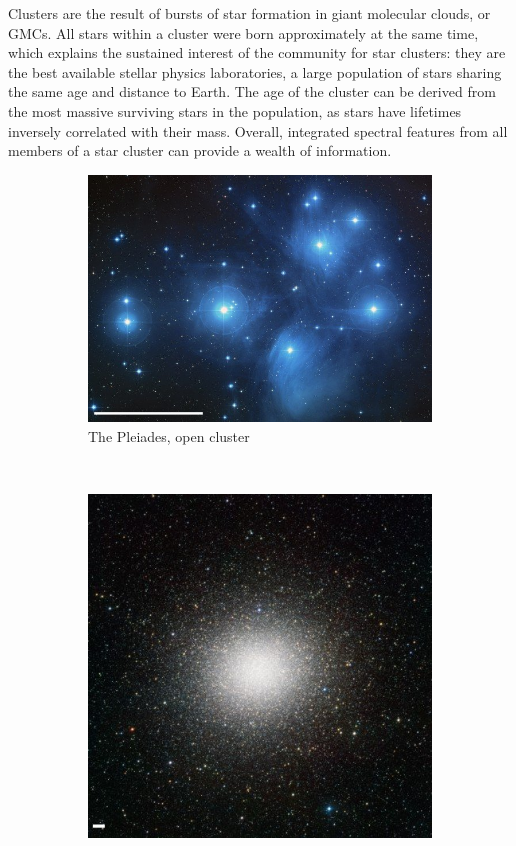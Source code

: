 Clusters are the result of bursts of star formation in giant molecular clouds, or GMCs. All stars within a cluster were born approximately at the same time, which explains the sustained interest of the community for star clusters: they are the best available stellar physics laboratories, a large population of stars sharing the same age and distance to Earth. The age of the cluster can be derived from the most massive surviving stars in the population, as stars have lifetimes inversely correlated with their mass. Overall, integrated spectral features from all members of a star cluster can provide a wealth of information. 

\begin{figure}
    \centering
    \begin{subfigure}[b]{0.55\textwidth}
        \includegraphics[width=\textwidth]{Figures/0_Pleiades_scale.jpg}
        \caption{The Pleiades, open cluster}
        \label{Fig:0_openglobular1.open}
    \end{subfigure}
    ~ 
    \begin{subfigure}[b]{0.4\textwidth}
        \includegraphics[width=\textwidth]{Figures/0_omega_centauri_scale.jpg}

\end{subfigure}
\end{figure}
